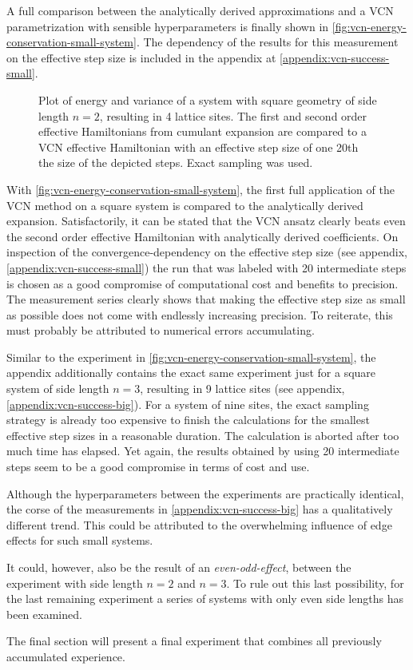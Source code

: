 A full comparison between the analytically derived approximations and a VCN parametrization with sensible hyperparameters is finally shown in \autoref{fig:vcn-energy-conservation-small-system}.
The dependency of the results for this measurement on the effective step size is included in the appendix at \ref{appendix:vcn-success-small}.

\begin{figure}[htbp]
    \centering
    \vspace{-0.5cm}
    \caption{
            Plot of energy and variance of a system with square geometry of side length $n=2$, resulting in 4 lattice sites.
            The first and second order effective Hamiltonians from cumulant expansion are compared to a VCN effective Hamiltonian with an effective step size of one 20th the size of the depicted steps.
            Exact sampling was used.
        }
    \label{fig:vcn-energy-conservation-small-system}
\end{figure}

With \autoref{fig:vcn-energy-conservation-small-system}, the first full application of the VCN method on a square system is compared to the analytically derived expansion.
Satisfactorily, it can be stated that the VCN ansatz clearly beats even the second order effective Hamiltonian with analytically derived coefficients.
On inspection of the convergence-dependency on the effective step size (see appendix, \ref{appendix:vcn-success-small}) the run that was labeled with 20 intermediate steps is chosen as a good compromise of computational cost and benefits to precision.
The measurement series clearly shows that making the effective step size as small as possible does not come with endlessly increasing precision.
To reiterate, this must probably be attributed to numerical errors accumulating.

Similar to the experiment in \autoref{fig:vcn-energy-conservation-small-system}, the appendix additionally contains the exact same experiment just for a square system of side length $n=3$, resulting in 9 lattice sites (see appendix, \ref{appendix:vcn-success-big}).
For a system of nine sites, the exact sampling strategy is already too expensive to finish the calculations for the smallest effective step sizes in a reasonable duration.
The calculation is aborted after too much time has elapsed.
Yet again, the results obtained by using 20 intermediate steps seem to be a good compromise in terms of cost and use.

Although the hyperparameters between the experiments are practically identical, the corse of the measurements in \ref{appendix:vcn-success-big} has a qualitatively different trend.
This could be attributed to the overwhelming influence of edge effects for such small systems. 

It could, however, also be the result of an \emph{even-odd-effect}, between the experiment with side length $n=2$ and $n=3$.
To rule out this last possibility, for the last remaining experiment a series of systems with only even side lengths has been examined.

The final section will present a final experiment that combines all previously accumulated experience.